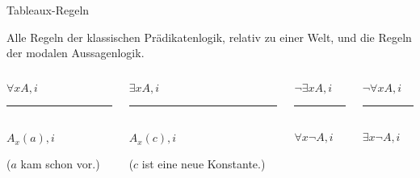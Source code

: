 \documentclass[12pt]{beamer}
\newcommand{\prule}{\vspace{-8pt}\rule{50pt}{0.5pt}}
\begin{document}
\begin{frame}{Tableaux-Regeln}

  Alle Regeln der klassischen Prädikatenlogik, relativ zu einer Welt,
  und die Regeln der modalen Aussagenlogik.

  \pause

  \begin{columns}
    \begin{column}[t]{.25 \linewidth}
      \begin{center}
        $\forall x A, i$ \\
        \prule\\
        $A_x(a), i$
      \end{center}
      ($a$ kam schon vor.)
    \end{column}
    
    \begin{column}[t]{.25 \linewidth}
      \begin{center}
        $\exists x A, i$ \\
        \prule\\
        $A_x(c), i$
      \end{center}
      ($c$ ist eine neue Konstante.)
    \end{column}
    
    \begin{column}[t]{.25 \linewidth}
      \begin{center}
        $\neg \exists x A, i$\\
        \prule\\
        $\forall x \neg A, i$\\
      \end{center}
    \end{column}
    
    \begin{column}[t]{.25 \linewidth}
      \begin{center}
        $\neg \forall x A, i$ \\
        \prule\\
        $\exists x \neg A, i$
      \end{center}
    \end{column}
  \end{columns}

  \pause
  

\end{frame}
\end{document}
